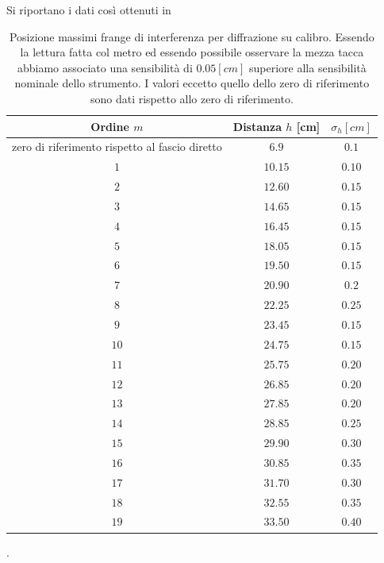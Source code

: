 Si riportano i dati così ottenuti in \begin{table}[hb]
 \centering
 \begin{tabular}{|c|c|c|}
 \hline
 \hline
  Ordine $m$ & Distanza $h$ [cm] & $\sigma_h [cm]$ \\
  \hline
  zero di riferimento rispetto al fascio diretto	&	$6.9$	&	$0.1$\\
  \hline
  $1$  & $10.15$ & $0.10$ \\
  $2$  & $12.60$ & $0.15$ \\
  $3$  & $14.65$ & $0.15$ \\
  $4$  & $16.45$ & $0.15$ \\
  $5$  & $18.05$ & $0.15$ \\
  $6$  & $19.50$ & $0.15$ \\
  $7$  & $20.90$ & $0.2$ \\
  $8$  & $22.25$ & $0.25$ \\
  $9$  & $23.45$ & $0.15$ \\
  $10$ & $24.75$ & $0.15$ \\
  $11$ & $25.75$ & $0.20$ \\
  $12$ & $26.85$ & $0.20$ \\
  $13$ & $27.85$ & $0.20$\\
  $14$ & $28.85$ & $0.25$ \\
  $15$ & $29.90$ & $0.30$ \\
  $16$ & $30.85$ & $0.35$ \\
  $17$ & $31.70$ & $0.30$ \\
  $18$ & $32.55$ & $0.35$ \\
  $19$ & $33.50$ &	$0.40$\\
  \hline
 \end{tabular}
 \caption{Posizione massimi frange di interferenza per diffrazione su calibro.
Essendo la lettura fatta  col metro ed essendo possibile osservare la
mezza tacca abbiamo associato una sensibilità di $0.05[cm]$ 
superiore alla sensibilità nominale dello strumento.
I valori eccetto quello dello zero di riferimento sono dati
rispetto allo zero di riferimento.}
	\label{tab:Ha-Na}
\end{table}
 .

